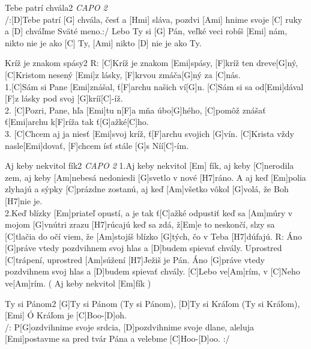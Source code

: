 \documentclass[12pt]{article}
\begin{document}
\begin{song}{Tebe patrí chvála}{2}
	\textit{CAPO 2}\\
	/:[D]Tebe patrí [G] chvála, 
	česť a [Hmi] sláva,
	pozdvi [Ami] hnime svoje [C] ruky 
	a [D] chváľme Sväté meno.:/
	\columnbreak
	Lebo Ty si [G] Pán, 
	veľké veci robíš [Emi] nám, 
	nikto nie je ako [C] Ty, 
	[Ami] nikto [D] nie je ako Ty.
\end{song}

\begin{song}{Kríž je znakom spásy}{2}
	R: [C]Kríž je znakom [Emi]spásy, 
	[F]kríž ten dreve[G]ný,
	[C]Kristom nesený [Emi]z lásky, 
	[F]krvou zmáča[G]ný za [C]nás.
	\\
	1.[C]Sám si Pane [Emi]znášal, 
	ť[F]archu našich ví[G]n.
	[C]Sám si sa od[Emi]dával 
	[F]z lásky pod svoj [G]kríí[C]-íž.
	\\
	2. [C]Pozri, Pane, hľa [Emi]tu 
	n[F]a mňa úbo[G]hého,
	[C]pomôž znášať ť[Emi]archu 
	k[F]ríža tak ť[G]ažké[C]ho.
	\\
	3. [C]Chcem aj ja niesť [Emi]svoj kríž,
	ť[F]archu svojich [G]vín.
	[C]Krista vždy nasle[Emi]dovať, 
	[F]chcem ísť stále [G]s Níí[C]-ím.
\end{song}

\begin{song}{Aj keby nekvitol fík}{2}
	\textit{CAPO 2}
	1.Aj keby nekvitol [Em] fík,
	aj keby [C]nerodila zem,
	aj keby [Am]nebesá nedoniesli [G]svetlo v nové [H7]ráno.
	A aj keď [Em]polia zlyhajú
	a sýpky [C]prázdne zostanú,
	aj keď [Am]všetko vôkol [G]volá, že Boh [H7]nie je.
	\\
	2.Keď blízky [Em]priateľ opustí,
	a je tak ť[C]ažké odpustiť
	keď sa [Am]múry v mojom [G]vnútri zrazu [H7]rúcajú
	keď sa zdá, ž[Em]e to neskončí,
	slzy sa [C]tlačia do očí
	viem, že [Am]stojíš blízko [G]tých, čo v Teba [H7]dúfajú.
	\columnbreak
	R: 
	Áno [G]práve vtedy pozdvihnem svoj hlas
	a [D]budem spievať chvály.
	Uprostred [C]trápení, uprostred [Am]súžení 
	[H7]Ježiš je Pán.
	Áno [G]práve vtedy pozdvihnem svoj hlas
	a [D]budem spievať chvály.
	[C]Lebo ve[Am]rím, v [C]Neho ve[Am]rím.
	( Aj keby nekvitol [Em]fík )
\end{song}

\begin{song}{Ty si Pánom}{2}
	[G]Ty si Pánom (Ty si Pánom), 
	[D]Ty si Kráľom (Ty si Kráľom),
	[Emi] Ó Kráľom je [C]Boo-[D]oh.
	\\
	/: P[G]ozdvihnime svoje srdcia,
	[D]pozdvihnime svoje dlane, aleluja
	[Emi]postavme sa pred tvár Pána 
	a velebme [C]Hoo-[D]oo. :/
\end{song}
	
\end{document}
